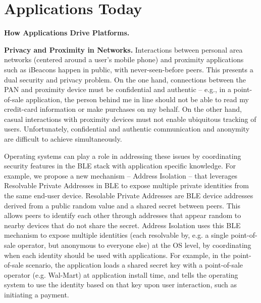 \section{Applications Today}

\smallskip\noindent
\textbf{How Applications Drive Platforms.}

\glipsum[1-2]

\smallskip\noindent
\textbf{Privacy and Proximity in Networks.}
Interactions between personal area networks (centered around a user’s mobile
phone) and proximity applications such as iBeacons happen in public, with
never-seen-before peers. This presents a dual security and privacy problem. On
the one hand, connections between the PAN and proximity device must be
confidential and authentic -- e.g., in a point-of-sale application, the person
behind me in line should not be able to read my credit-card information or
make purchases on my behalf. On the other hand, casual interactions with
proximity devices must not enable ubiquitous tracking of users. Unfortunately,
confidential and authentic communication and anonymity are difficult to
achieve simultaneously.

Operating systems can play a role in addressing these issues by coordinating
security features in the BLE stack with application specific knowledge. For
example, we propose a new mechanism -- Address Isolation -- that leverages
Resolvable Private Addresses in BLE to expose multiple private identities from
the same end-user device. Resolable Private Addresses are BLE device addresses
derived from a public random value and a shared secret between peers. This
allows peers to identify each other through addresses that appear random to
nearby devices that do not share the secret. Address Isolation uses this BLE
mechanism to expose multiple identities (each resolvable by, e.g. a single
point-of-sale operator, but anonymous to everyone else) at the OS level, by
coordinating when each identity should be used with applications. For example,
in the point-of-sale scenario, the application loads a shared secret key with
a point-of-sale operator (e.g. Wal-Mart) at application install time, and
tells the operating system to use the identity based on that key upon user
interaction, such as initiating a payment.

